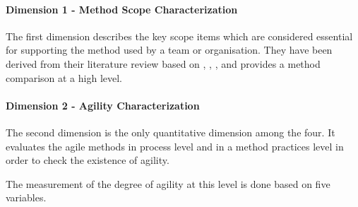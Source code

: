 \paragraph{Dimension 1 - Method Scope Characterization}
The first dimension describes the key scope items which are considered essential for supporting the method used by a team or organisation. They have been derived from their literature review based on \citet{Beck:2004:EPE:1076267}, \citet{koch2005agile}, \citet{Palmer:2001:PGF:600044}, \citet{Highsmith:2000:ASD:323922} and provides a method comparison at a high level.


%

\paragraph{Dimension 2 - Agility Characterization}
The second dimension is the only quantitative dimension among the four. It evaluates the agile methods in process level and in a method practices level in order to check the existence of agility.

The measurement of the degree of agility at this level is done based on five variables. %

